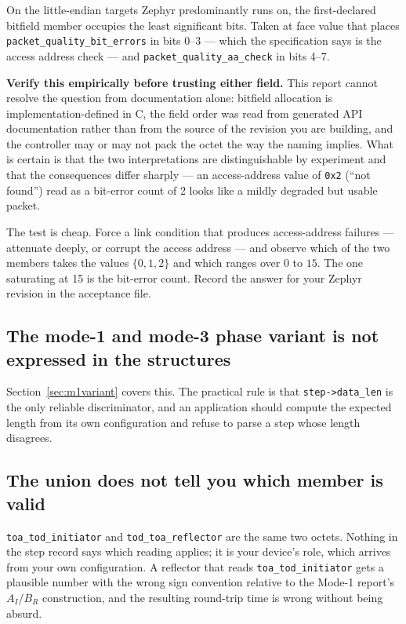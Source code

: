 \documentclass[11pt,a4paper]{article}
\newcommand{\code}[1]{\texttt{\small #1}}
\begin{document}
On the little-endian targets Zephyr predominantly runs on, the first-declared bitfield member
occupies the least significant bits. Taken at face value that places
\code{packet\_\allowbreak{}quality\_\allowbreak{}bit\_\allowbreak{}errors} in bits 0--3 --- which the specification says is the access
address check --- and \code{packet\_\allowbreak{}quality\_\allowbreak{}aa\_\allowbreak{}check} in bits 4--7.

\begin{caution}
\textbf{Verify this empirically before trusting either field.} This report cannot resolve the
question from documentation alone: bitfield allocation is implementation-defined in C, the field
order was read from generated API documentation rather than from the source of the revision you are
building, and the controller may or may not pack the octet the way the naming implies. What is
certain is that the two interpretations are distinguishable by experiment and that the consequences
differ sharply --- an access-address value of \code{0x2} (``not found'') read as a bit-error count of
2 looks like a mildly degraded but usable packet.

The test is cheap. Force a link condition that produces access-address failures --- attenuate deeply,
or corrupt the access address --- and observe which of the two members takes the values
$\{0,1,2\}$ and which ranges over $0$ to $15$. The one saturating at 15 is the bit-error count.
Record the answer for your Zephyr revision in the acceptance file.
\end{caution}

\subsection{The mode-1 and mode-3 phase variant is not expressed in the structures}

Section~\ref{sec:m1variant} covers this. The practical rule is that \code{step->data\_\allowbreak{}len} is the
only reliable discriminator, and an application should compute the expected length from its own
configuration and refuse to parse a step whose length disagrees.

\subsection{The union does not tell you which member is valid}

\code{toa\_\allowbreak{}tod\_\allowbreak{}initiator} and \code{tod\_\allowbreak{}toa\_\allowbreak{}reflector} are the same two octets. Nothing in the
step record says which reading applies; it is your device's role, which arrives from your own
configuration. A reflector that reads \code{toa\_\allowbreak{}tod\_\allowbreak{}initiator} gets a plausible number with the
wrong sign convention relative to the Mode-1 report's $A_I$/$B_R$ construction, and the resulting
round-trip time is wrong without being absurd.
\end{document}
